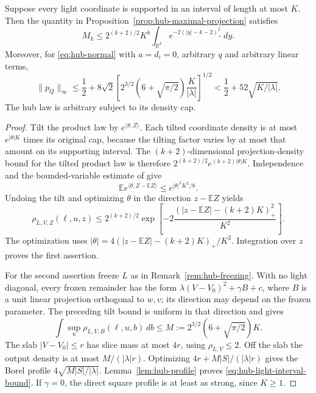 \begin{proposition}\label{prop:hub-light-intervals}
Suppose every light coordinate is supported in an interval of length
at most $K$.  Then the quantity in
Proposition~\ref{prop:hub-maximal-projection} satisfies
\[
 M_k\le2^{(k+2)/2}K^k
  \int_{\mathbb R^k}e^{-2(|y|-k-2)_+^2}\,dy.
\]
Moreover, for \eqref{eq:hub-normal} with $a=d_i=0$, arbitrary $q$
and arbitrary linear terms,
\begin{equation}\label{eq:hub-light-interval-bound}
 \|p_Q\|_\infty\le\frac12+
 8\sqrt2\left[2^{3/2}\left(6+\sqrt{\pi/2}\right)
                         \frac K{|\lambda|}\right]^{1/2}
 <\frac12+52\sqrt{K/|\lambda|}.
\end{equation}
The hub law is arbitrary subject to its density cap.
\end{proposition}

\begin{proof}
Tilt the product law by $e^{\langle\theta,Z\rangle}$.
Each tilted coordinate density is at most $e^{|\theta|K}$ times
its original cap, because the tilting factor varies by at most
that amount on its supporting interval.  The $(k+2)$-dimensional
projection-density bound for the tilted product law is therefore
$2^{(k+2)/2}e^{(k+2)|\theta|K}$.
Independence and the bounded-variable estimate of
\citet{Hoeffding1963} give
\[
 \mathbb E e^{\langle\theta,Z-\mathbb EZ\rangle}
                 \le e^{|\theta|^2K^2/8}.
\]
Undoing the tilt and optimizing $\theta$ in the direction
$z-\mathbb EZ$ yields
\[
 \rho_{L,V,Z}(\ell,u,z)
 \le2^{(k+2)/2}
  \exp\left[-2\frac{(|z-\mathbb EZ|-(k+2)K)_+^2}{K^2}\right].
\]
The optimization uses
$|\theta|=4(|z-\mathbb EZ|-(k+2)K)_+/K^2$.
Integration over $z$ proves the first assertion.

For the second assertion freeze $L$ as in
Remark~\ref{rem:hub-freezing}.  With no light diagonal, every frozen
remainder has the form
$\lambda(V-V_0)^2+\gamma B+c$, where $B$ is a unit linear
projection orthogonal to $w,v$; its direction may depend on the
frozen parameter.  The preceding tilt bound is uniform in that
direction and gives
\[
 \int\sup_u\rho_{L,V,B}(\ell,u,b)\,db
 \le M:=2^{3/2}\left(6+\sqrt{\pi/2}\right)K.
\]
The slab $|V-V_0|\le r$ has slice mass at most $4r$, using
$\rho_{L,V}\le2$.  Off the slab the output density is at most
$M/(|\lambda|r)$.  Optimizing
$4r+M|S|/(|\lambda|r)$ gives the Borel profile
$4\sqrt{M|S|/|\lambda|}$.
Lemma~\ref{lem:hub-profile} proves
\eqref{eq:hub-light-interval-bound}.  If $\gamma=0$, the direct
square profile is at least as strong, since $K\ge1$.
\end{proof}

